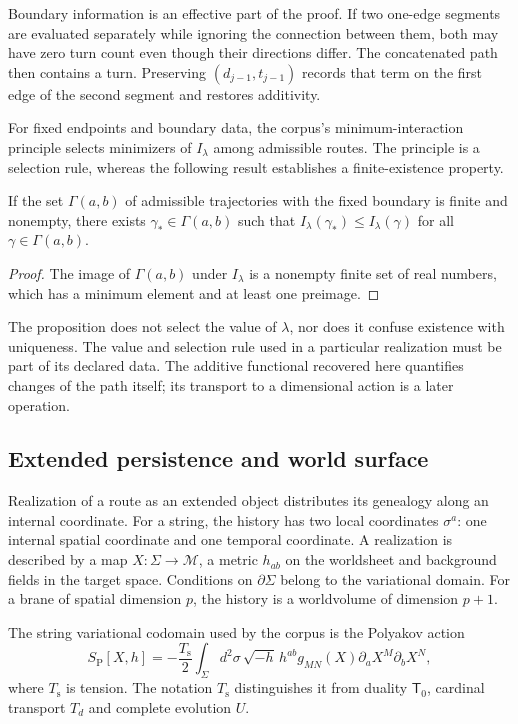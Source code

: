 Boundary information is an effective part of the proof.
If two one-edge segments are evaluated separately
while ignoring the connection between them, both may have zero
turn count even though their directions differ. The
concatenated path then contains a turn. Preserving
\((d_{j-1},t_{j-1})\) records that term on the first
edge of the second segment and restores additivity.

For fixed endpoints and boundary data, the corpus's
minimum-interaction principle selects minimizers of
\(I_\lambda\) among admissible routes. The principle
is a selection rule, whereas the following
result establishes a finite-existence property.

\begin{proposition}
If the set \(\Gamma(a,b)\) of admissible trajectories
with the fixed boundary is finite and nonempty, there exists
\(\gamma_*\in\Gamma(a,b)\) such that
\(I_\lambda(\gamma_*)\leq I_\lambda(\gamma)\)
for all \(\gamma\in\Gamma(a,b)\).
\end{proposition}
\begin{proof}
The image of \(\Gamma(a,b)\) under \(I_\lambda\) is
a nonempty finite set of real numbers, which has
a minimum element and at least one preimage.
\end{proof}

The proposition does not select the value of \(\lambda\),
nor does it confuse existence with uniqueness. The value and
selection rule used in a particular realization
must be part of its declared data. The additive
functional recovered here quantifies changes of the path
itself; its transport to a dimensional action is
a later operation.

\subsection{Extended persistence and world surface}

Realization of a route as an extended object distributes
its genealogy along an internal coordinate. For a string,
the history has two local coordinates \(\sigma^a\):
one internal spatial coordinate and one temporal coordinate. A realization is
described by a map \(X:\Sigma\to\mathcal M\), a
metric \(h_{ab}\) on the worldsheet and background
fields in the target space. Conditions on
\(\partial\Sigma\) belong to the variational domain.
For a brane of spatial dimension \(p\), the history
is a worldvolume of dimension \(p+1\).

The string variational codomain used by the corpus
is the Polyakov action
\begin{equation}
 S_{\mathrm P}[X,h]
 =-\frac{T_{\mathrm s}}2\int_\Sigma d^2\sigma\,
 \sqrt{-h}\,h^{ab}g_{MN}(X)
             \partial_aX^M\partial_bX^N,
 \label{x_reciprocidad:iv:eq:polyakov}
\end{equation}
where \(T_{\mathrm s}\) is tension. The notation
\(T_{\mathrm s}\) distinguishes it from duality
\(\mathsf T_0\), cardinal transport \(T_d\)
and complete evolution \(U\).

